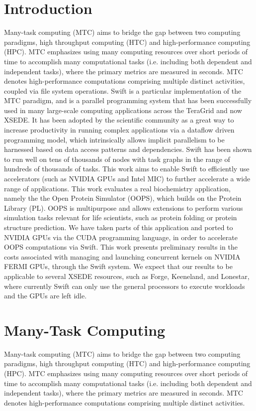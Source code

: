 \documentclass[conference]{IEEEtran}
\begin{document}
\section{Introduction}
Many-task computing (MTC) \cite{raicu2008toward} aims to bridge the gap between two computing paradigms, high throughput computing (HTC) and high-performance computing (HPC). MTC emphasizes using many computing resources over short periods of time to accomplish many computational tasks (i.e. including both dependent and independent tasks), where the primary metrics are measured in seconds. MTC denotes high-performance computations comprising multiple distinct activities, coupled via file system operations. Swift is a particular implementation of the MTC paradigm, and is a parallel programming system that has been successfully used in many large-scale computing applications across the TeraGrid and now XSEDE. It has been adopted by the scientific community as a great way to increase productivity in running complex applications via a dataflow driven programming model, which intrinsically allows implicit parallelism to be harnessed based on data access patterns and dependencies. Swift has been shown to run well on tens of thousands of nodes with task graphs in the range of hundreds of thousands of tasks. This work aims to enable Swift to efficiently use accelerators (such as NVIDIA GPUs and
Intel MIC) to further accelerate a wide range of applications. This work evaluates a real biochemistry application, namely the the Open Protein Simulator (OOPS), which builds on the Protein Library (PL). OOPS is multipurpose and allows extensions to perform various simulation tasks relevant for life scientists, such as protein folding or protein structure prediction. We have taken parts of this application and ported to NVIDIA GPUs via the CUDA programming language, in order to accelerate OOPS computations via Swift. This work presents preliminary results in the costs associated with managing and launching concurrent kernels on NVIDIA FERMI GPUs, through the Swift system. We expect that our results to be applicable to several XSEDE resources, such as Forge, Keeneland, and Lonestar, where currently Swift can only use the general processors to execute workloads and the GPUs are left idle.

\section{Many-Task Computing}
Many-task computing (MTC) aims to bridge the gap between two computing paradigms, high throughput computing (HTC) and high-performance computing (HPC). MTC emphasizes using many computing resources over short periods of time to accomplish many computational tasks (i.e. including both dependent and independent tasks), where the primary metrics are measured in seconds. MTC denotes high-performance computations comprising multiple distinct activities.
\end{document}
